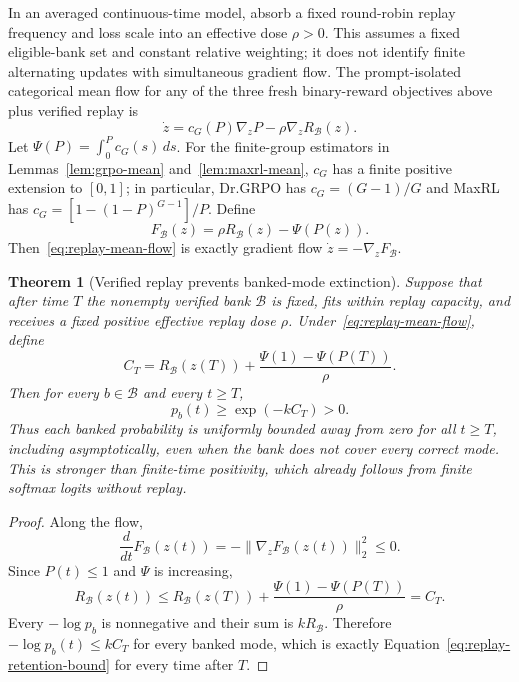 \documentclass{article}
\newcommand{\1}{\mathbf 1}
\newtheorem{theorem}[lemma]{Theorem}
\theoremstyle{remark}
\theoremstyle{definition}
\theoremstyle{plain}
\begin{document}
In an averaged continuous-time model, absorb a fixed round-robin replay
frequency and loss scale into an effective dose $\rho>0$. This assumes a
fixed eligible-bank set and constant relative weighting; it does not identify
finite alternating updates with simultaneous gradient flow. The prompt-isolated categorical mean flow for any of the three fresh
binary-reward objectives above plus verified replay is
\begin{equation}
  \dot z
  =c_G(P)\nabla_zP-\rho\nabla_zR_{\mathcal B}(z).
  \label{eq:replay-mean-flow}
\end{equation}
Let $\Psi(P)=\int_0^P c_G(s)\,ds$. For the finite-group estimators in Lemmas~\ref{lem:grpo-mean}
and~\ref{lem:maxrl-mean}, $c_G$ has a finite positive extension to $[0,1]$;
in particular, Dr.GRPO has $c_G=(G-1)/G$ and MaxRL has
$c_G=[1-(1-P)^{G-1}]/P$. Define
\begin{equation}
  F_{\mathcal B}(z)=\rho R_{\mathcal B}(z)-\Psi(P(z)).
  \label{eq:replay-potential}
\end{equation}
Then~\eqref{eq:replay-mean-flow} is exactly gradient flow
$\dot z=-\nabla_zF_{\mathcal B}$.

\begin{theorem}[Verified replay prevents banked-mode extinction]
\label{thm:replay-retention}
Suppose that after time $T$ the nonempty verified bank $\mathcal B$ is fixed,
fits within replay capacity, and receives a fixed positive effective replay
dose $\rho$. Under~\eqref{eq:replay-mean-flow}, define
\[
  C_T
  =R_{\mathcal B}(z(T))
   +\frac{\Psi(1)-\Psi(P(T))}{\rho}.
\]
Then for every $b\in\mathcal B$ and every $t\ge T$,
\begin{equation}
  p_b(t)\ge \exp(-kC_T)>0.
  \label{eq:replay-retention-bound}
\end{equation}
Thus each banked probability is uniformly bounded away from zero for all
$t\ge T$, including asymptotically, even when the bank does not cover every
correct mode. This is stronger than finite-time positivity, which already
follows from finite softmax logits without replay.
\end{theorem}

\begin{proof}
Along the flow,
\[
  \frac{d}{dt}F_{\mathcal B}(z(t))
  =-\lVert\nabla_zF_{\mathcal B}(z(t))\rVert_2^2\le0.
\]
Since $P(t)\le1$ and $\Psi$ is increasing,
\[
  R_{\mathcal B}(z(t))
  \le R_{\mathcal B}(z(T))
     +\frac{\Psi(1)-\Psi(P(T))}{\rho}
  =C_T.
\]
Every $-\log p_b$ is nonnegative and their sum is
$kR_{\mathcal B}$. Therefore
$-\log p_b(t)\le kC_T$ for every banked mode, which is exactly
Equation~\eqref{eq:replay-retention-bound} for every time after $T$.
\end{proof}
\end{document}
